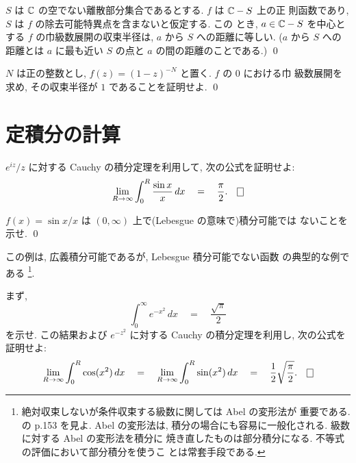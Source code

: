 \documentclass[12pt,twoside]{jarticle}
\begin{document}
\begin{question}
  $S$ は ${\mathbb C}$ の空でない離散部分集合であるとする. $f$ は ${\mathbb C}-S$ 上の正
  則函数であり, $S$ は $f$ の除去可能特異点を含まないと仮定する. この
  とき, $a\in{\mathbb C}-S$ を中心とする $f$ の巾級数展開の収束半径は, $a$ から 
  $S$ への距離に等しい. ($a$ から $S$ への距離とは $a$ に最も近い $S$ 
  の点と $a$ の間の距離のことである.) \qed
\end{question}

\begin{question}
  $N$ は正の整数とし, $f(z)=(1-z)^{-N}$ と置く. $f$ の $0$ における巾
  級数展開を求め, その収束半径が $1$ であることを証明せよ. \qed
\end{question}


\section{定積分の計算}

\begin{question}
  $e^{iz}/z$ に対する Cauchy の積分定理を利用して, 次の公式を証明せよ:
  \[
    \lim_{R\to\infty} \int_0^R \frac{\sin x}{x}\,dx 
    \quad = \quad
    \frac{\pi}{2}.
    \qed
  \]
\end{question}

\begin{question}
  $f(x)= \sin x/x$ は $(0,\infty)$ 上で(Lebesgue の意味で)積分可能では
  ないことを示せ.  \qed
\end{question}

\noindent この例は, 広義積分可能であるが, Lebesgue 積分可能でない函数
の典型的な例である%
\footnote{絶対収束しないが条件収束する級数に関しては Abel の変形法が
  重要である. \cite{kaiseki-gairon} の p.153 を見よ. Abel の変形法は, 
  積分の場合にも容易に一般化される. 級数に対する Abel の変形法を積分に
  焼き直したものは部分積分になる. 不等式の評価において部分積分を使うこ
  とは常套手段である.}. 

\begin{question}
  まず, 
  \[
    \int_0^\infty e^{-x^2}\,dx
    \quad = \quad
    \frac{\sqrt{\pi}}{2}
  \]
  を示せ. この結果および $e^{-z^2}$ に対する Cauchy の積分定理を利用し,
  次の公式を証明せよ:
  \[
    \lim_{R\to\infty}\int_0^R \cos(x^2)\,dx
    \quad = \quad
    \lim_{R\to\infty}\int_0^R \sin(x^2)\,dx
    \quad = \quad
    \frac{1}{2}\sqrt{\frac{\pi}{2}}.
    \qed
  \]
\end{question}
\end{document}
